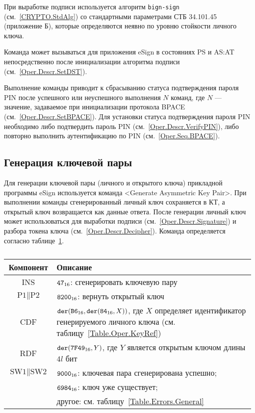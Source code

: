 При выработке подписи используется алгоритм \texttt{bign-sign}
(см.~\ref{CRYPTO.StdAlg}) со стандартными параметрами СТБ 34.101.45 
(приложение Б), которые определяются неявно по уровню стойкости личного ключа.


Команда может вызываться для приложения eSign в состояниях 
PS и AS:AT непосредственно после инициализации алгоритма подписи
(см.~\ref{Oper.Descr.SetDST}).

Выполнение команды приводит к сбрасыванию статуса подтверждения пароля PIN
после успешного или неуспешного выполнения $N$ команд, где $N$ --- значение, 
задаваемое при инициализации протокола BPACE (см.~\ref{Oper.Descr.SetBPACE}).
Для установки статуса подтверждения пароля PIN 
необходимо либо подтвердить пароль PIN (см.~\ref{Oper.Descr.VerifyPIN}), 
либо повторно выполнить аутентификацию по PIN (см.~\ref{Oper.Seq.BPACE}).


\subsection{Генерация ключевой пары}\label{Oper.Descr.GenKeys}

Для генерации ключевой пары (личного и открытого ключа) прикладной программы eSign
используется команда <Generate Asymmetric Key Pair>. При выполнении команды 
сгенерированный личный ключ сохраняется в КТ,
а открытый ключ возвращается как данные ответа.
После генерации личный ключ может использоваться 
для выработки подписи (см.~\ref{Oper.Descr.Signature}) и
разбора токена ключа (см.~\ref{Oper.Descr.Decipher}).
Команда определяется согласно 
таблице~\ref{Table.Oper.GenKeysCmd}.

\begin{table}[hbt]
\caption{}\label{Table.Oper.GenKeysCmd}
\begin{tabular}{|c|p{14cm}|}
\hline
Компонент & Описание\\
\hline
\hline
INS & $\texttt{47}_{16}$: сгенерировать ключевую пару \\
\hline
$\text{P1} \parallel\text{P2}$ & $\texttt{8200}_{16}$:
вернуть открытый ключ \\
\hline
CDF & $\texttt{der}(\texttt{B6}_{16},\texttt{der}(\texttt{84}_{16}, X))$,
где $X$ определяет идентификатор генерируемого личного ключа
(см. таблицу~\ref{Table.Oper.KeyRef}) \\
\hline 
RDF & $\texttt{der}(\texttt{7F49}_{16}, Y)$, где $Y$ является открытым ключом длины $4l$ бит\\
\hline
$\text{SW1} \parallel \text{SW2}$ & 
$\texttt{9000}_{16}$: ключевая пара сгенерирована успешно; \\
  & $\texttt{6984}_{16}$: ключ уже существует; \\
  & другое: см. таблицу~\ref{Table.Errors.General} \\
\hline
\end{tabular}
\end{table}

